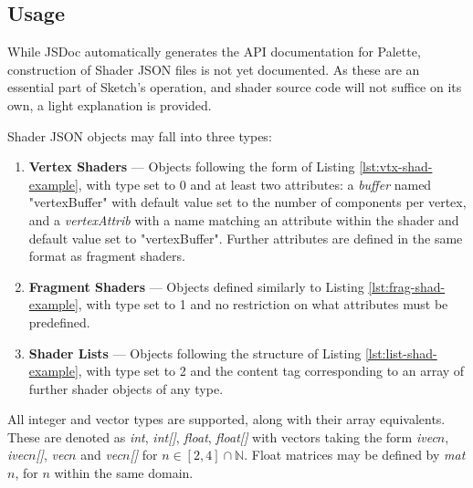 \documentclass{l3proj}
\begin{document}
\subsection{Usage}
\label{arch-shad-use}

While JSDoc automatically generates the API documentation for Palette, construction of Shader JSON files is not yet documented. As these are an essential part of Sketch's operation, and shader source code will not suffice on its own, a light explanation is provided.

Shader JSON objects may fall into three types:
\begin{enumerate}
\item \textbf{Vertex Shaders} --- Objects following the form of Listing \ref{lst:vtx-shad-example}, with type set to 0 and at least two attributes: a \textit{buffer} named "vertexBuffer" with default value set to the number of components per vertex, and a \textit{vertexAttrib} with a name matching an attribute within the shader and default value set to "vertexBuffer". Further attributes are defined in the same format as fragment shaders.
\item \textbf{Fragment Shaders} --- Objects defined similarly to Listing \ref{lst:frag-shad-example}, with type set to 1 and no restriction on what attributes must be predefined.
\item \textbf{Shader Lists} --- Objects following the structure of Listing \ref{lst:list-shad-example}, with type set to 2 and the content tag corresponding to an array of further shader objects of any type.
\end{enumerate}
All integer and vector types are supported, along with their array equivalents. These are denoted as \textit{int}, \textit{int[]}, \textit{float}, \textit{float[]} with vectors taking the form \textit{ivec$n$}, \textit{ivec$n$[]}, \textit{vec$n$} and \textit{vec$n$[]} for $ n \in [2,4]\cap\mathbb{N}$. Float matrices may be defined by \textit{mat$n$}, for $n$ within the same domain.
\end{document}
